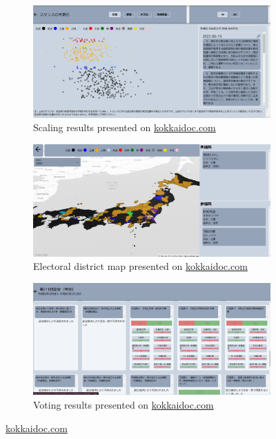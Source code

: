 \documentclass[final,5p,times,twocolumn,authoryear]{elsarticle}
\begin{document}
\begin{figure}[h]
\centering
    \begin{subfigure}{0.22\textwidth}
      \centering
      \includegraphics[width=1\linewidth]{figs/kokkaidoc-scaling.png}
      \caption{Scaling results presented on \url{kokkaidoc.com}}
    \end{subfigure}
    \begin{subfigure}{0.22\textwidth}
      \centering
      \includegraphics[width=1\linewidth]{figs/kokkaidoc-map.png}
      \caption{Electoral district map presented on \url{kokkaidoc.com}}
    \end{subfigure}
    \begin{subfigure}{0.22\textwidth}
      \centering
      \includegraphics[width=1\linewidth]{figs/kokkaidoc-voting.png}
      \caption{Voting results presented on \url{kokkaidoc.com}}
    \end{subfigure}
\caption{\url{kokkaidoc.com}}
\label{fig: kokkaidoc-figs}
\end{figure}
\end{document}
